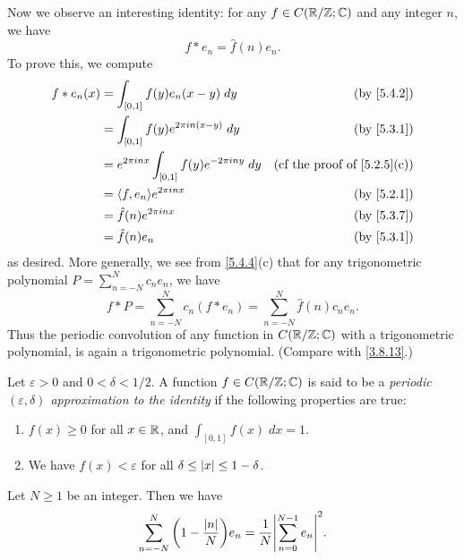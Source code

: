 \begin{ac}\label{ac:5.4.1}
  Now we observe an interesting identity:
  for any \(f \in C(\mathbb{R} / \mathbb{Z} ; \mathbb{C})\) and any integer \(n\), we have
  \[
    f * e_n = \hat{f}(n) e_n.
  \]
  To prove this, we compute
  \begin{align*}
    f * e_n(x) & = \int_{[0, 1]} f(y) e_n(x - y) \; dy                        & \text{(by \cref{5.4.2})}                 \\
               & = \int_{[0, 1]} f(y) e^{2 \pi i n (x - y)} \; dy             & \text{(by \cref{5.3.1})}                 \\
               & = e^{2 \pi i n x} \int_{[0, 1]} f(y) e^{- 2 \pi i n y} \; dy & \text{(cf the proof of \cref{5.2.5}(c))} \\
               & = \inner*{f, e_n} e^{2 \pi i n x}                            & \text{(by \cref{5.2.1})}                 \\
               & = \hat{f}(n) e^{2 \pi i n x}                                 & \text{(by \cref{5.3.7})}                 \\
               & = \hat{f}(n) e_n                                             & \text{(by \cref{5.3.1})}
  \end{align*}
  as desired.
  More generally, we see from \cref{5.4.4}(c) that for any trigonometric polynomial \(P = \sum_{n = -N}^N c_n e_n\), we have
  \[
    f * P = \sum_{n = -N}^N c_n (f * e_n) = \sum_{n = -N}^N \hat{f}(n) c_n e_n.
  \]
  Thus the periodic convolution of any function in \(C(\mathbb{R} / \mathbb{Z} ; \mathbb{C})\) with a trigonometric polynomial, is again a trigonometric polynomial.
  (Compare with \cref{3.8.13}.)
\end{ac}

\begin{defn}\label{5.4.5}
  Let \(\varepsilon > 0\) and \(0 < \delta < 1 / 2\).
  A function \(f \in C(\mathbb{R} / \mathbb{Z} ; \mathbb{C})\) is said to be a \emph{periodic \((\varepsilon, \delta)\) approximation to the identity} if the following properties are true:
  \begin{enumerate}
    \item \(f(x) \geq 0\) for all \(x \in \mathbb{R}\), and \(\int_{[0, 1]} f(x) \; dx = 1\).
    \item We have \(f(x) < \varepsilon\) for all \(\delta \leq \left\lvert x\right\rvert \leq 1 - \delta\).
  \end{enumerate}
\end{defn}

\begin{ac}\label{ac:5.4.2}
  Let \(N \geq 1\) be an integer.
  Then we have
  \[
    \sum_{n = -N}^N \bigg(1 - \frac{\abs{n}}{N}\bigg) e_n = \frac{1}{N} \abs{\sum_{n = 0}^{N - 1} e_n}^2.
  \]
\end{ac}

